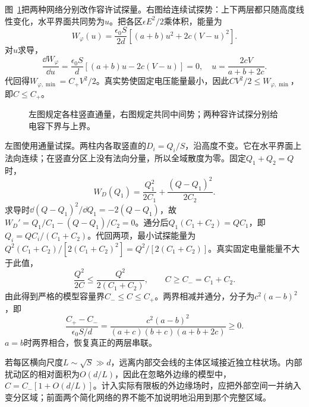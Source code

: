 \begin{solution}
图~\ref{fig:es4-e7-s}把两种网络分别改作容许试探量。右图给连续试探势：上下两层都只随高度线性变化，水平界面共同势为$u$。把各区$\epsilon E^2/2$乘体积，能量为
\[W_\varphi(u)=\frac{\epsilon_0S}{2d}
[(a+b)u^2+2c(V-u)^2].
\]
对$u$求导，
\[\frac{\dd W_\varphi}{\dd u}=\frac{\epsilon_0S}{d}[(a+b)u-2c(V-u)]=0,
\quad u=\frac{2cV}{a+b+2c}.
\]
代回得$W_{\varphi,\min}=C_+V^2/2$。真实势使固定电压能量最小，因此$CV^2/2\le W_{\varphi,\min}$，即$C\le C_+$。
\begin{figure}[H]\centering
{}
\caption{左图规定各柱竖直通量，右图规定共同中间势；两种容许试探分别给电容下界与上界。}\label{fig:es4-e7-s}
\end{figure}
左图使用通量试探。两柱内各取竖直的$D_i=Q_i/S$，沿高度不变。它在水平界面上法向连续；在竖直分区上没有法向分量，所以全域散度为零。固定$Q_1+Q_2=Q$时，
\[W_D(Q_1)=\frac{Q_1^2}{2C_1}+\frac{(Q-Q_1)^2}{2C_2}.
\]
求导时$\dd(Q-Q_1)^2/\dd Q_1=-2(Q-Q_1)$，故$W_D'=Q_1/C_1-(Q-Q_1)/C_2=0$。通分后$Q_1(C_1+C_2)=QC_1$，即$Q_i=QC_i/(C_1+C_2)$。代回两项，最小试探能量为$Q^2(C_1+C_2)/[2(C_1+C_2)^2]=Q^2/[2(C_1+C_2)]$。真实固定电量能量不大于此值，
\[\frac{Q^2}{2C}\le\frac{Q^2}{2(C_1+C_2)},\qquad C\ge C_-=C_1+C_2.
\]
由此得到严格的模型容量界$\boxed{C_-\le C\le C_+}$。两界相减并通分，分子为$c^2(a-b)^2$，即
\[\frac{C_+-C_-}{\epsilon_0S/d}
=\frac{c^2(a-b)^2}{(a+c)(b+c)(a+b+2c)}\ge0.
\]
$a=b$时两界相合，恢复真正的两层串联。

若每区横向尺度$L\sim\sqrt S\gg d$，远离内部交会线的主体区域接近独立柱状场。内部扰动区的相对面积为$O(d/L)$，因此在忽略外边缘的模型中，$C=C_-[1+O(d/L)]$。计入实际有限板的外边缘场时，应把外部空间一并纳入变分区域；前面两个简化网络的界不能不加说明地沿用到那个完整区域。
\end{solution}

